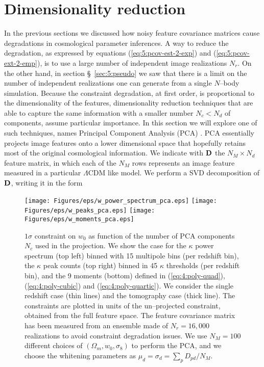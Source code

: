 \section{Dimensionality reduction}
\label{sec:5:dimred}
In the previous sections we discussed how noisy feature covariance matrices cause degradations in cosmological parameter inferences. A way to reduce the degradation, as expressed by equations (\ref{eq:5:pcov-est-2-exp}) and (\ref{eq:5:pcov-ext-2-emp}), is to use a large number of independent image realizations $N_r$. On the other hand, in section \S~\ref{sec:5:pseudo} we saw that there is a limit on the number of independent realizations one can generate from a single $N$--body simulation. Because the constraint degradation, at first order, is proportional to the dimensionality of the features, dimensionality reduction techniques that are able to capture the same information with a smaller number $N_c<N_d$ of components, assume particular importance. In this section we will explore one of such techniques, names Principal Component Analysis (PCA) \citep{astroMLText}. PCA essentially projects image features onto a lower dimensional space that hopefully retains most of the original cosmological information. We indicate with $\mathbf{D}$ the $N_M\times N_d$ feature matrix, in which each of the $N_M$ rows represents an image feature measured in a particular $\Lambda$CDM like model. We perform a SVD decomposition \citep{scipy,astroMLText} of $\mathbf{D}$, writing it in the form
%  
\begin{figure}
\begin{center}
\texttt{[image: Figures/eps/w\_power\_spectrum\_pca.eps]} \texttt{[image: Figures/eps/w\_peaks\_pca.eps]}
\texttt{[image: Figures/eps/w\_moments\_pca.eps]}
\end{center}
\caption{$1\sigma$ constraint on $w_0$ as function of the number of PCA components $N_c$ used in the projection. We show the case for the $\kappa$ power spectrum (top left) binned with 15 multipole bins (per redshift bin), the $\kappa$ peak counts (top right) binned in 45 $\kappa$ thresholds (per redshift bin), and the 9 moments (bottom) defined in (\ref{eq:4:poly-quad}), (\ref{eq:4:poly-cubic}) and (\ref{eq:4:poly-quartic}). We consider the single redshift case (thin lines) and the tomography case (thick line). The constraints are plotted in units of the un--projected constraint, obtained from the full feature space. The feature covariance matrix has been measured from an ensemble made of $N_r=16,000$ realizations to avoid constraint degradation issues. We use $N_M=100$ different choices of $(\Omega_m,w_0,\sigma_8)$ to perform the PCA, and we choose the whitening parameters as $\mu_d=\sigma_d=\sum_p D_{pd}/N_M$.}
\label{fig:5:pca}
\end{figure}
